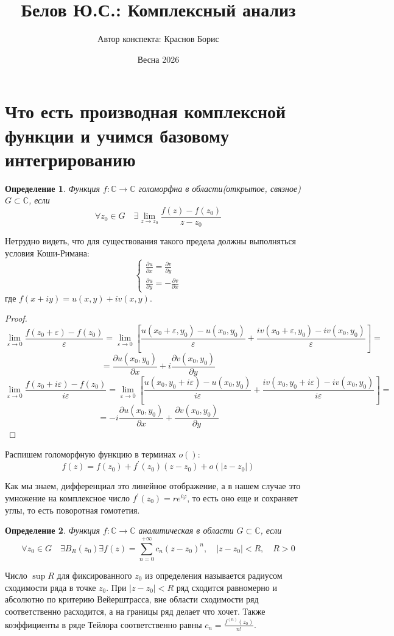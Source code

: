 \documentclass[12pt,a4paper]{article} %
\author{Автор конспекта: Краснов Борис} %
\title{Белов Ю.С.: Комплексный анализ} %
\date{Весна 2026} %
\newtheorem{definition}{Определение}
\newcommand{\Co}{\mathbb{C}}
\begin{document}
	\maketitle
	\tableofcontents
	\clearpage
	\section{Что есть производная комплексной функции и учимся базовому интегрированию}
	\begin{definition}
		Функция $f:\Co\rightarrow\Co $ голоморфна в области(открытое, связное) $G\subset\Co$, если
		$$\forall z_0\in G\quad\exists\lim_{z\rightarrow z_0}\frac{f(z)-f(z_0)}{z-z_0}$$
	\end{definition}
	Нетрудно видеть, что для существования такого предела должны выполняться условия Коши-Римана:
	\begin{equation}\label{условиеК-Р}
		\begin{cases}
			\displaystyle\frac{\partial u}{\partial x}=\frac{\partial v}{\partial y}\\
			\displaystyle\frac{\partial u}{\partial y}=-\frac{\partial v}{\partial x}
		\end{cases}
	\end{equation}
	где $f(x+iy)=u(x,y)+iv(x,y)$.
	\begin{proof}
		$$\lim_{\varepsilon\rightarrow 0}\frac{f(z_0+\varepsilon)-f(z_0)}{\varepsilon}=\lim_{\varepsilon\rightarrow 0}\left[\frac{u(x_0+\varepsilon,y_0)-u(x_0,y_0)}{\varepsilon}+\frac{iv(x_0+\varepsilon,y_0)-iv(x_0,y_0)}{\varepsilon}\right]=$$ $$=\frac{\partial u(x_0,y_0)}{\partial x}+i\frac{\partial v(x_0,y_0)}{\partial y}$$
		$$\lim_{\varepsilon\rightarrow 0}\frac{f(z_0+i\varepsilon)-f(z_0)}{i\varepsilon}=\lim_{\varepsilon\rightarrow 0}\left[\frac{u(x_0,y_0+i\varepsilon)-u(x_0,y_0)}{i\varepsilon}+\frac{iv(x_0,y_0+i\varepsilon)-iv(x_0,y_0)}{i\varepsilon}\right]=$$ $$=-i\frac{\partial u(x_0,y_0)}{\partial x}+\frac{\partial v(x_0,y_0)}{\partial y}$$
	\end{proof}
	Распишем голоморфную функцию в терминах $o()$:
	$$f(z)=f(z_0)+f^{'}(z_0)(z-z_0)+o(|z-z_0|)$$\par
	Как мы знаем, дифференциал это линейное отображение, а в нашем случае это умножение на комплексное число $f^{'}(z_0)=re^{i\varphi}$, то есть оно еще и сохраняет углы, то есть поворотная гомотетия.
	\begin{definition}
		Функция $f:\Co\rightarrow\Co $ аналитическая в области $G\subset\Co$, если
		$$\forall z_0\in G\quad\exists B_R(z_0)\exists f(z)=\sum_{n=0}^{+\infty}c_n(z-z_0)^n,\quad |z-z_0|<R,\quad R>0$$
	\end{definition}
	Число $\sup R$ для фиксированного $z_0$ из определения называется радиусом сходимости ряда в точке $z_0$. При $|z-z_0|<R$ ряд сходится равномерно и абсолютно по критерию Вейерштрасса, вне области сходимости ряд соответственно расходится, а на границы ряд делает что хочет. Также коэффициенты в ряде Тейлора соответственно равны $\displaystyle c_n=\frac{f^{(n)}(z_0)}{n!}$.
	
\end{document}
